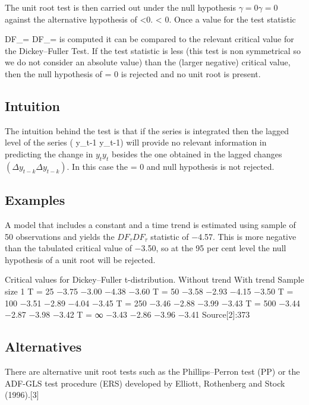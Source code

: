 The unit root test is then carried out under the null hypothesis ${\displaystyle \gamma =0} \gamma = 0$ against the alternative hypothesis of {\displaystyle \gamma <0.} \gamma < 0. Once a value for the test statistic

{\displaystyle DF_{\tau }={}} DF_\tau = 
is computed it can be compared to the relevant critical value for the Dickey–Fuller Test. If the test statistic is less (this test is non symmetrical so we do not consider an absolute value) than the (larger negative) critical value, then the null hypothesis of {\displaystyle {}} \gamma = 0 is rejected and no unit root is present.

\subsection*{Intuition}
The intuition behind the test is that if the series is integrated then the lagged level of the series ( {\displaystyle y_{t-1}}  y_{t-1}) will provide no relevant information in predicting the change in ${\displaystyle y_{t}}   y_{t}$  besides the one obtained in the lagged changes $( {\displaystyle \Delta y_{t-k}}   \Delta y_{t-k} )$. In this case the {\displaystyle {}} \gamma = 0 and null hypothesis is not rejected.

\subsection*{Examples}
A model that includes a constant and a time trend is estimated using sample of 50 observations and yields the ${\displaystyle DF_{\tau }} DF_\tau$ statistic of −4.57. This is more negative than the tabulated critical value of −3.50, so at the 95 per cent level the null hypothesis of a unit root will be rejected.

Critical values for Dickey–Fuller t-distribution.
Without trend	With trend
Sample size	1%
T = 25	−3.75	−3.00	−4.38	−3.60
T = 50	−3.58	−2.93	−4.15	−3.50
T = 100	−3.51	−2.89	−4.04	−3.45
T = 250	−3.46	−2.88	−3.99	−3.43
T = 500	−3.44	−2.87	−3.98	−3.42
T = ∞	−3.43	−2.86	−3.96	−3.41
Source[2]:373
\subsection*{Alternatives}
There are alternative unit root tests such as the Phillips–Perron test (PP) or the ADF-GLS test procedure (ERS) developed by Elliott, Rothenberg and Stock (1996).[3]

